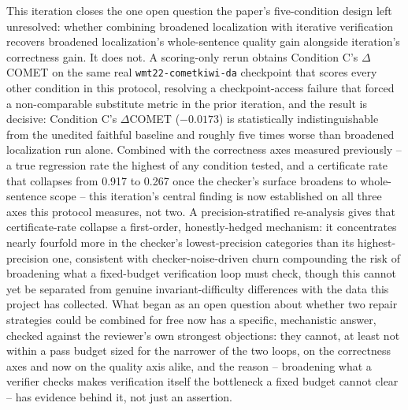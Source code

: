 \documentclass[11pt,letterpaper]{article}
\begin{document}
This iteration closes the one open question the paper's five-condition design left unresolved: whether combining broadened localization with iterative verification recovers broadened localization's whole-sentence quality gain alongside iteration's correctness gain. It does not. A scoring-only rerun obtains Condition C's $\Delta$COMET on the same real \texttt{wmt22-cometkiwi-da} checkpoint that scores every other condition in this protocol, resolving a checkpoint-access failure that forced a non-comparable substitute metric in the prior iteration, and the result is decisive: Condition C's $\Delta$COMET ($-0.0173$) is statistically indistinguishable from the unedited faithful baseline and roughly five times worse than broadened localization run alone. Combined with the correctness axes measured previously -- a true regression rate the highest of any condition tested, and a certificate rate that collapses from 0.917 to 0.267 once the checker's surface broadens to whole-sentence scope -- this iteration's central finding is now established on all three axes this protocol measures, not two. A precision-stratified re-analysis gives that certificate-rate collapse a first-order, honestly-hedged mechanism: it concentrates nearly fourfold more in the checker's lowest-precision categories than its highest-precision one, consistent with checker-noise-driven churn compounding the risk of broadening what a fixed-budget verification loop must check, though this cannot yet be separated from genuine invariant-difficulty differences with the data this project has collected. What began as an open question about whether two repair strategies could be combined for free now has a specific, mechanistic answer, checked against the reviewer's own strongest objections: they cannot, at least not within a pass budget sized for the narrower of the two loops, on the correctness axes and now on the quality axis alike, and the reason -- broadening what a verifier checks makes verification itself the bottleneck a fixed budget cannot clear -- has evidence behind it, not just an assertion.



\end{document}
